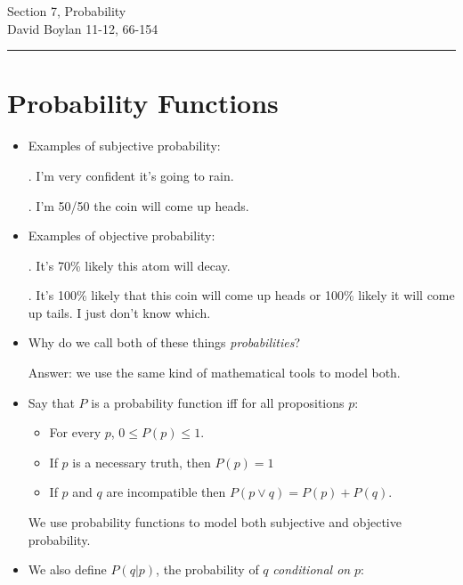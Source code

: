 \documentclass[justified]{tufte-handout}
\newcommand{\HRule}{\rule{\linewidth}{0.1mm}}
\begin{document}
\frenchspacing

\begin{fullwidth}
\noindent\Large Section 7,  Probability \large \\[.3cm]
\noindent  David Boylan \hfill{11-12, 66-154}

\noindent\HRule
\end{fullwidth}


\section{Probability Functions}

\begin{itemize}


\item Examples of subjective probability:

\ex. I'm very confident it's going to rain.

\ex. I'm 50/50 the coin will come up heads.


\item Examples of objective probability: 


\ex. It's 70\% likely this atom will decay. 

\ex. It's 100\% likely that this coin will come up heads or 100\% likely it will come up tails. I just don't know which.


\item Why do we call both of these things \emph{probabilities}? 

Answer: we use the same kind of mathematical tools to model both. 



\item Say that $P$ is a probability function iff for all propositions $p$: 

\begin{itemize}

\item For every $p$, $0 \leq P(p) \leq 1$. 

\item If $p$ is a necessary truth, then $P(p)=1$


\item If $p$ and $q$ are incompatible then $P(p\vee q)= P(p)+P(q)$.

\end{itemize}

We use probability functions to model both subjective and objective probability.

\item We also define $P(q|p)$, the probability of $q$ \emph{conditional on} $p$:


\end{itemize}
\end{document}
